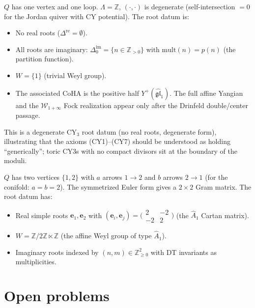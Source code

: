 \begin{example}
\label{ex:c3-root-datum}
$Q$ has one vertex and one loop. $\Lambda = \mathbb{Z}$, $(\cdot, \cdot)$ is degenerate (self-intersection $= 0$ for the Jordan quiver with CY potential). The root datum is:
\begin{itemize}
 \item No real roots ($\Delta^{\mathrm{re}} = \emptyset$).
 \item All roots are imaginary: $\Delta^{\mathrm{im}}_0 = \{n \in \mathbb{Z}_{>0}\}$ with $\mathrm{mult}(n) = p(n)$ (the partition function).
 \item $W = \{1\}$ (trivial Weyl group).
 \item The associated CoHA is the positive half
 $Y^+(\widehat{\mathfrak{gl}}_1)$. The full affine Yangian and the
 $\mathcal{W}_{1+\infty}$ Fock realization appear only after the
 Drinfeld double/center passage.
\end{itemize}
This is a degenerate CY$_3$ root datum (no real roots, degenerate form), illustrating that the axioms (CY1)--(CY7) should be understood as holding ``generically''; toric CY3s with no compact divisors sit at the boundary of the moduli.
\end{example}

\begin{example}
\label{ex:conifold-root-datum}
$Q$ has two vertices $\{1, 2\}$ with $a$ arrows $1 \to 2$ and $b$ arrows $2 \to 1$ (for the conifold: $a = b = 2$). The symmetrized Euler form gives a $2 \times 2$ Gram matrix. The root datum has:
\begin{itemize}
 \item Real simple roots $\mathbf{e}_1, \mathbf{e}_2$ with $(\mathbf{e}_i, \mathbf{e}_j) = \bigl(\begin{smallmatrix} 2 & -2 \\ -2 & 2 \end{smallmatrix}\bigr)$ (the $\widehat{A}_1$ Cartan matrix).
 \item $W = \mathbb{Z}/2\mathbb{Z} \ltimes \mathbb{Z}$ (the affine Weyl group of type $\widehat{A}_1$).
 \item Imaginary roots indexed by $(n, m) \in \mathbb{Z}^2_{\geq 0}$ with DT invariants as multiplicities.
\end{itemize}
\end{example}


\section{Open problems}
\label{sec:root-datum-open}

